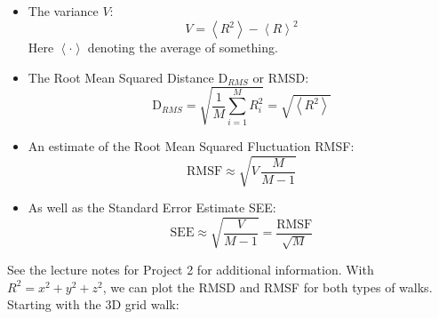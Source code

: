 \documentclass[a4paper,12pt]{article}
\begin{document}
\begin{itemize}
  \item The variance $V$:
  \begin{equation*}
    V = \left\langle R^2 \right\rangle - \left\langle R \right\rangle ^2
  \end{equation*}
  Here $\left\langle \cdot \right\rangle$ denoting the average of something.

  \item The Root Mean Squared Distance $\mathrm{D}_{RMS}$ or RMSD:
  \begin{equation*}
    \mathrm{D}_{RMS} = \sqrt{\frac{1}{M}\sum_{i = 1}^{M} R_i^2} = \sqrt{\left\langle R^2 \right\rangle}
  \end{equation*}

  \item An estimate of the Root Mean Squared Fluctuation RMSF:
  \begin{equation*}
    \mathrm{RMSF} \approx \sqrt{V \, \frac{M}{M - 1}}
  \end{equation*}

  \item As well as the Standard Error Estimate SEE:
  \begin{equation*}
    \mathrm{SEE} \approx \sqrt{\frac{V}{M - 1}} = \frac{\mathrm{RMSF}}{\sqrt{M}}
  \end{equation*}
\end{itemize}

See the lecture notes for Project 2 for additional information. \cite{Hess}
With $R^2 = x^2 + y^2 + z^2$, we can plot the RMSD and RMSF for both types of walks. Starting with the 3D grid
walk:
\end{document}
